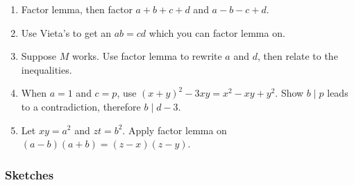 \documentclass[11pt,paper=letter]{scrartcl}
\begin{document}
\begin{enumerate}
\item \label{h:12} Factor lemma, then factor $a + b + c + d$ and $a - b - c + d$. %
\item \label{h:8} Use Vieta's to get an $ab = cd$ which you can factor lemma on. %
\item \label{h:14} Suppose $M$ works. Use factor lemma to rewrite $a$ and $d$, then relate to the inequalities. %
\item \label{h:20} When $a = 1$ and $c = p$, use $(x + y)^2 - 3xy = x^2 - xy + y^2$. Show $b \mid p$ leads to a contradiction, therefore $b \mid d - 3$. %
\item \label{h:16} Let $xy = a^2$ and $zt = b^2$. Apply factor lemma on $(a - b)(a + b) = (z - x)(z - y)$. %

\end{enumerate}

\newpage

\subsubsection*{Sketches}
\end{document}
